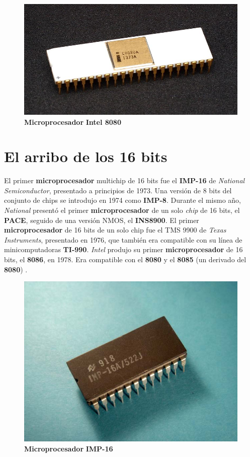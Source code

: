 \begin{figure}[htb]
	\centering
	\includegraphics[scale = 0.2]{Graphics/8080_microprocessorr.jpg}
	\caption{\textbf{Microprocesador} \textbf{Intel 8080}}
	\label{fig:14}
\end{figure}

\section{El arribo de los 16 bits}
El primer \textbf{microprocesador} multichip de 16 bits fue el \textbf{IMP-16} de \emph{National Semiconductor}, presentado a principios de
1973. Una versión de 8 bits del conjunto de chips se introdujo en 1974 como \textbf{IMP-8}. Durante el mismo año, \emph{National} presentó
el primer \textbf{microprocesador} de un solo \emph{chip} de 16 bits, el \textbf{PACE}, seguido de una versión NMOS, el \textbf{INS8900}.
El primer \textbf{microprocesador} de 16 bits de un solo chip fue el TMS 9900 de \emph{Texas Instruments}, presentado en 1976, que también
era compatible con su línea de minicomputadoras \textbf{TI-990}. \emph{Intel} produjo su primer \textbf{microprocesador} de 16 bits, el \textbf{8086},
en 1978. Era compatible con el \textbf{8080} y el \textbf{8085} (un derivado del \textbf{8080}) .

\begin{figure}[htb]
	\centering
	\includegraphics[scale = 0.2]{Graphics/NSIMP-16A.jpg}
	\caption{\textbf{Microprocesador} \textbf{IMP-16}}
	\label{fig:15}
\end{figure}

